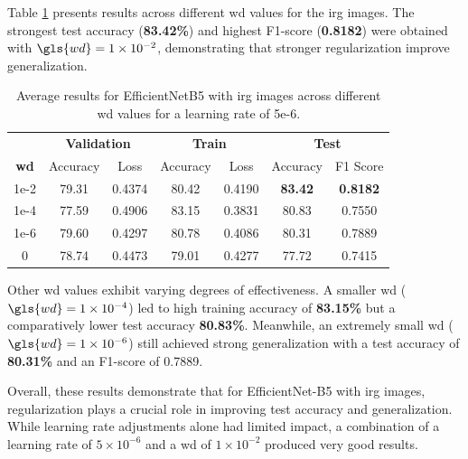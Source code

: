 Table \ref{tab:efficientnetb5_wd_irg} presents results across different \gls{wd} values
for the \gls{irg} images. The strongest test accuracy (\textbf{83.42\%}) and highest F1-score 
(\textbf{0.8182}) were obtained with $\gls{wd}=1\times10^{-2}$, demonstrating that stronger 
regularization improve generalization.

\begin{table}[h]
    \centering
    \renewcommand{\arraystretch}{1.3}
    \setlength{\tabcolsep}{8pt}
    \begin{tabular}{|c|cccccc|}
        \hline
        & \multicolumn{2}{c}{\textbf{Validation}} & \multicolumn{2}{c}{\textbf{Train}} & \multicolumn{2}{c|}{\textbf{Test}} \\
        \textbf{\gls{wd}} & Accuracy & Loss & Accuracy & Loss & Accuracy & F1 Score \\
        \hline
        1e-2 & 79.31    & 0.4374 & 80.42  & 0.4190  & \textbf{83.42}  & \textbf{0.8182} \\
        1e-4 & 77.59    & 0.4906 & 83.15  & 0.3831  & 80.83  & 0.7550 \\
        1e-6 & 79.60    & 0.4297 & 80.78  & 0.4086  & 80.31  & 0.7889 \\
        0    & 78.74    & 0.4473 & 79.01 & 0.4277 & 77.72 & 0.7415 \\
        \hline
    \end{tabular}
    \caption{Average results for EfficientNetB5 with \gls{irg} images across different \gls{wd} values for a learning rate of 5e-6.}
    \label{tab:efficientnetb5_wd_irg}
\end{table}

Other \gls{wd} values exhibit varying degrees of effectiveness. A smaller \gls{wd} 
($\gls{wd}=1\times10^{-4}$) led to high training accuracy of \textbf{83.15\%} but a comparatively lower 
test accuracy \textbf{80.83\%}. Meanwhile, an extremely small \gls{wd} ($\gls{wd}=1\times10^{-6}$) 
still achieved strong generalization with a test accuracy of \textbf{80.31\%} and an F1-score of 0.7889.

Overall, these results demonstrate that for EfficientNet-B5 with \gls{irg} images, 
regularization plays a crucial role in improving test accuracy and generalization. 
While learning rate adjustments alone had limited impact, a combination of a learning 
rate of $5\times10^{-6}$ and a \gls{wd} of $1\times10^{-2}$ produced very good 
results.



